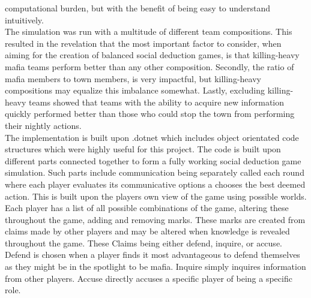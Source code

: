computational burden, but with the benefit of being easy to understand
intuitively. \\
The simulation was run with a multitude of different team compositions. This
resulted in the revelation that the most important factor to consider, when
aiming for the creation of balanced social deduction games, is that killing-heavy mafia teams perform better than any other composition. Secondly, the ratio of mafia members to town members, is very impactful, but killing-heavy compositions may equalize this imbalance somewhat. Lastly, excluding killing-heavy teams showed that teams with the ability to acquire new information quickly performed better than those who could stop the town from performing their nightly actions.\\
The implementation is built upon .dotnet which includes object orientated code
structures which were highly useful for this project. The code is built upon
different parts connected together to form a fully working social deduction game simulation.
Such parts include communication being separately called each round where each player
evaluates its communicative options a chooses the best deemed action.
This is built upon the players own view of the game using possible
worlds. Each player has a list of all possible combinations of the game, altering these throughout the game, adding and removing marks. These marks are
created from claims made by other players and may be altered when knowledge is revealed
throughout the game. These Claims being either defend, inquire, or accuse. Defend is chosen when a player finds it most advantageous to defend themselves as they might
be in the spotlight to be mafia. Inquire simply inquires information from other
players. Accuse directly accuses a specific player of being a
specific role. 
\twocolumn